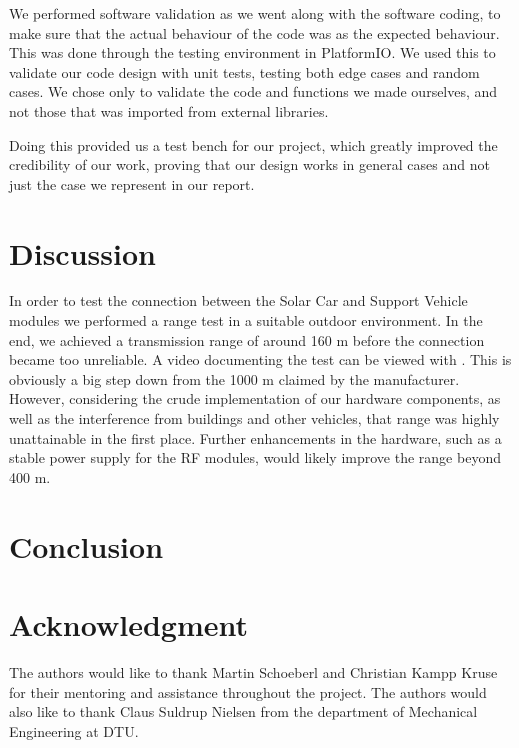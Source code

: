 \documentclass[conference]{IEEEtran}
\newcommand{\MYhref}[3][blue]{\href{#2}{\color{#1}{#3}}}
\begin{document}
We performed software validation as we went along with the software coding, to make sure that the actual behaviour of the code was as the expected behaviour. This was done through the testing environment in PlatformIO. We used this to validate our code design with unit tests, testing both edge cases and random cases. We chose only to validate the code and functions we made ourselves, and not those that was imported from external libraries.

Doing this provided us a test bench for our project, which greatly improved the credibility of our work, proving that our design works in general cases and not just the case we represent in our report.


\section{Discussion}


In order to test the connection between the Solar Car and Support Vehicle modules we performed a range test in a suitable outdoor environment. In the end, we achieved a transmission range of around 160 m before the connection became too unreliable. A video documenting the test can be viewed with \MYhref{https://youtu.be/-iwST3REn40}{this link}. This is obviously a big step down from the 1000 m claimed by the manufacturer. However, considering the crude implementation of our hardware components, as well as the interference from buildings and other vehicles, that range was highly unattainable in the first place. Further enhancements in the hardware, such as a stable power supply for the RF modules, would likely improve the range beyond 400 m. 
 

\section{Conclusion}



\section*{Acknowledgment}
The authors would like to thank Martin Schoeberl and Christian Kampp Kruse for their mentoring and assistance throughout the project. The authors would also like to thank Claus Suldrup Nielsen from the department of Mechanical Engineering at DTU.


\printbibliography
\end{document}
